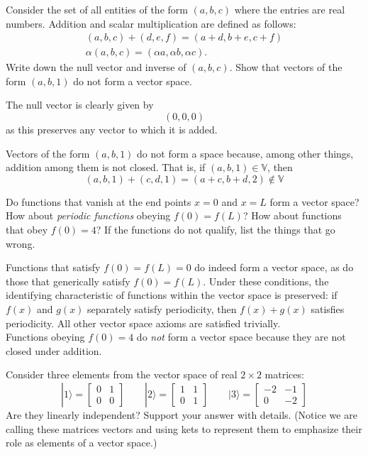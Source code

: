 \documentclass[../principles-of-quantum-mechanics.tex]{subfiles}
\begin{document}
\begin{questions}
\question Consider the set of all entities of the form $(a, b, c)$ where the
entries are real numbers. Addition and scalar multiplication are defined as
follows:
\begin{gather*}
  (a, b, c) + (d, e, f) = (a + d, b + e, c + f) \\
  \alpha(a, b, c) = (\alpha{a}, \alpha{b}, \alpha{c}).
\end{gather*}
Write down the null vector and inverse of $(a, b, c)$. Show that vectors of the form $(a, b, 1)$ do not form a vector space.

\begin{solution}
	The null vector is clearly given by 
	\[
		(0, 0, 0)
	\]
	as this preserves any vector to which it is added.
	
	Vectors of the form $(a, b, 1)$ do not form a space because, among other things, addition among them is not closed. That is, if $(a, b, 1) \in \mathbb{V}$, then
	\[
		(a, b, 1) + (c, d, 1) = (a + c, b + d, 2) \not\in \mathbb{V}
	\]
\end{solution}

\question Do functions that vanish at the end points $x=0$ and $x=L$ form a vector space? How about \textit{periodic functions} obeying $f(0)=f(L)$? How about functions that obey $f(0)=4$? If the functions do not qualify, list the things that go wrong.

\begin{solution}
	Functions that satisfy $f(0)=f(L)=0$ do indeed form a vector space, as do those that generically satisfy $f(0)=f(L)$. Under these conditions, the identifying characteristic of functions within the vector space is preserved: if $f(x)$ and $g(x)$ separately satisfy periodicity, then $f(x)+g(x)$ satisfies periodicity. All other vector space axioms are satisfied trivially. \\
	
	Functions obeying $f(0)=4$ do \textit{not} form a vector space because they are not closed under addition.
\end{solution}

\question Consider three elements from the vector space of real $2\times{2}$ matrices:
\[
	|1\rangle = \begin{bmatrix}
	0 & 1 \\ 0 & 0
	\end{bmatrix} \qquad
	|2\rangle = \begin{bmatrix}
	1 & 1 \\ 0 & 1
	\end{bmatrix} \qquad
	|3\rangle = \begin{bmatrix}
	-2 & -1 \\ 0 & -2
	\end{bmatrix}
\]
Are they linearly independent? Support your answer with details. (Notice we are calling these matrices vectors and using kets to represent them to emphasize their role as elements of a vector space.)


\end{questions}
\end{document}
